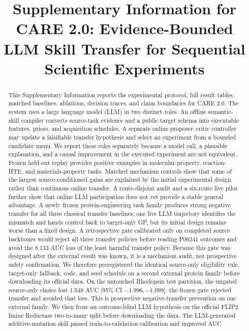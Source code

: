 \documentclass[pdflatex,sn-nature]{sn-jnl}
\title[CARE 2.0 Supplementary Information]{Supplementary Information for CARE 2.0: Evidence-Bounded LLM Skill Transfer for Sequential Scientific Experiments}
\author*[1]{\fnm{Anonymous} \sur{Authors}}
\affil*[1]{\orgdiv{Anonymous submission}}
\newcommand{\care}{CARE 2.0}
\begin{document}
\maketitle

\begin{abstract}
\mbox{T}his Supplementary Information reports the experimental protocol, full result
tables, matched baselines, ablations, decision traces, and claim boundaries for
\care. The system uses a large language model (LLM) in two distinct roles. An
offline semantic-skill compiler converts source-task evidence and a public
target schema into executable features, priors, and acquisition schedules. A
separate online proposer--critic controller may update a falsifiable transfer
hypothesis and select an experiment from a bounded candidate menu. We report
these roles separately because a model call, a plausible explanation, and a
causal improvement in the executed experiment are not equivalent. Frozen
held-out replay provides positive examples in molecular-property, reaction-HTE,
and materials-property tasks. Matched mechanism controls show that some of the
largest source-conditioned gains are explained by the initial experimental
design rather than continuous online transfer. A route-disjoint audit and a
six-route live pilot further show that online LLM participation does not yet
provide a stable general advantage. A newly frozen protein-engineering task
family produces strong negative transfer for all three classical transfer
baselines; one live LLM trajectory identifies the mismatch and hands control
back to target-only GP, but its initial design remains worse than a fixed
design. A retrospective gate calibrated only on completed source backbones
would reject all three transfer policies before reading P06241 outcomes and
avoid the 8.133 AUC loss of the least harmful transfer policy. Because this gate
was designed after the external result was known, it is a mechanism audit, not
prospective safety confirmation. We therefore preregistered the identical
source-only eligibility rule, target-only fallback, code, and seed schedule on
a second external protein family before downloading its official data. On the
untouched Rhodopsin test partition, the ungated source-only choice lost 1.548
AUC [95\% CI $-1.996,-1.099$]; the frozen gate rejected transfer and avoided
that loss. This is prospective negative-transfer prevention on one external
family. We then froze an outcome-blind LLM hypothesis on the official FLIP2
Imine Reductase two-to-many split before downloading the data. The LLM-generated
additive-mutation skill passed train-to-validation calibration and improved AUC

\end{abstract}
\end{document}
